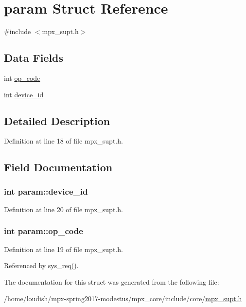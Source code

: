 \hypertarget{structparam}{}\section{param Struct Reference}
\label{structparam}


{\ttfamily \#include $<$mpx\+\_\+supt.\+h$>$}

\subsection*{Data Fields}
\begin{DoxyCompactItemize}
\item 
int \hyperlink{structparam_a81c8b24055c2908ebe480598aba6044c}{op\+\_\+code}
\item 
int \hyperlink{structparam_a44a7285b02749114186a9f9971941bcb}{device\+\_\+id}
\end{DoxyCompactItemize}


\subsection{Detailed Description}


Definition at line 18 of file mpx\+\_\+supt.\+h.



\subsection{Field Documentation}
\subsubsection[{\texorpdfstring{device\+\_\+id}{device_id}}]{\setlength{\rightskip}{0pt plus 5cm}int param\+::device\+\_\+id}\hypertarget{structparam_a44a7285b02749114186a9f9971941bcb}{}\label{structparam_a44a7285b02749114186a9f9971941bcb}


Definition at line 20 of file mpx\+\_\+supt.\+h.

\subsubsection[{\texorpdfstring{op\+\_\+code}{op_code}}]{\setlength{\rightskip}{0pt plus 5cm}int param\+::op\+\_\+code}\hypertarget{structparam_a81c8b24055c2908ebe480598aba6044c}{}\label{structparam_a81c8b24055c2908ebe480598aba6044c}


Definition at line 19 of file mpx\+\_\+supt.\+h.



Referenced by sys\+\_\+req().



The documentation for this struct was generated from the following file\+:\begin{DoxyCompactItemize}
\item 
/home/loudish/mpx-\/spring2017-\/modestus/mpx\+\_\+core/include/core/\hyperlink{include_2core_2mpx__supt_8h}{mpx\+\_\+supt.\+h}\end{DoxyCompactItemize}

